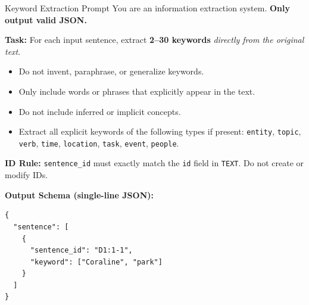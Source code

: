 \documentclass{llmxive}
\begin{document}
\begin{promptbox}{Keyword Extraction Prompt}
You are an information extraction system. \textbf{Only output valid JSON.}

\textbf{Task:}
For each input sentence, extract \textbf{2--30 keywords} \emph{directly from the original text}.
\begin{itemize}[leftmargin=1.25em,itemsep=2pt,topsep=2pt]
  \item Do not invent, paraphrase, or generalize keywords.
  \item Only include words or phrases that explicitly appear in the text.
  \item Do not include inferred or implicit concepts.
  \item Extract all explicit keywords of the following types if present:
  \texttt{entity}, \texttt{topic}, \texttt{verb}, \texttt{time}, \texttt{location}, \texttt{task}, \texttt{event}, \texttt{people}.
\end{itemize}

\textbf{ID Rule:}
\texttt{sentence\_id} must exactly match the \texttt{id} field in \texttt{TEXT}.  
Do not create or modify IDs.

\textbf{Output Schema (single-line JSON):}
\begin{lstlisting}[style=json]
{
  "sentence": [
    {
      "sentence_id": "D1:1-1",
      "keyword": ["Coraline", "park"]
    }
  ]
}
\end{lstlisting}
\end{promptbox}
\end{document}
